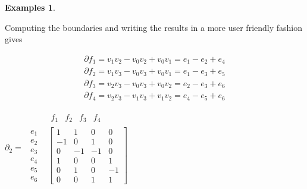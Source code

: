 \documentclass[draft,toc=bib]{scrartcl}
\theoremstyle{plain}
\theoremstyle{definition}
\newtheorem{examples}[theorem]{Examples}
\theoremstyle{remark}
\begin{document}
\begin{examples}
\begin{enumerate}
 Computing the boundaries and writing the results in a more user friendly fashion gives
 
 \parbox[c]{.6\linewidth}{
 \begin{align*}
 	\partial f_1=v_1v_2-v_0v_2+v_0v_1=e_1-e_2+e_4\\
 	\partial f_2=v_1v_3-v_0v_3+v_0v_1=e_1-e_3+e_5\\
 	\partial f_3=v_2v_3-v_0v_3+v_0v_2=e_2-e_3+e_6\\
 	\partial f_4=v_2v_3-v_1v_3+v_1v_2=e_4-e_5+e_6
 \end{align*}}%
\parbox[c]{.4\linewidth}{
	$\partial_2=\begin{matrix}
		 	&\begin{matrix}f_1	&f_2	&f_3	&f_4\end{matrix}\\
		\begin{matrix}
		e_1	\\
		e_2	\\
		e_3	\\
		e_4	\\
		e_5	\\
		e_6	
		\end{matrix}&
		\begin{bmatrix}
		1		&1		&0		&0\\
		-1		&0		&1		&0\\
		0		&-1		&-1		&0\\
		1		&0		&0		&1\\
		0		&1		&0		&-1\\
		0		&0		&1		&1
		\end{bmatrix}
	\end{matrix}$	
}


\end{enumerate}
\end{examples}
\end{document}
